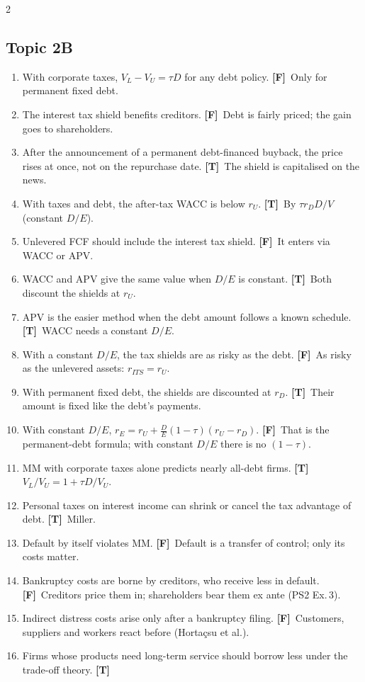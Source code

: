 \documentclass[10pt,a4paper]{article}
\newcommand{\blk}[1]{\subsection*{\color{hd}#1}}
\newcommand{\T}{\textbf{\color{ok}[T]}~}
\newcommand{\F}{\textbf{\color{wr}[F]}~}
\begin{document}
\begin{multicols}{2}
\blk{Topic 2B}
\begin{enumerate}[label=\arabic*.,start=48,leftmargin=1.6em,itemsep=2pt]
  \item With corporate taxes, $V_L-V_U=\tau D$ for any debt policy. \F Only for permanent fixed debt.
  \item The interest tax shield benefits creditors. \F Debt is fairly priced; the gain goes to
        shareholders.
  \item After the announcement of a permanent debt-financed buyback, the price rises at once, not on
        the repurchase date. \T The shield is capitalised on the news.
  \item With taxes and debt, the after-tax WACC is below $r_U$. \T By $\tau r_D D/V$ (constant $D/E$).
  \item Unlevered FCF should include the interest tax shield. \F It enters via WACC or APV.
  \item WACC and APV give the same value when $D/E$ is constant. \T Both discount the shields at $r_U$.
  \item APV is the easier method when the debt amount follows a known schedule. \T WACC needs a
        constant $D/E$.
  \item With a constant $D/E$, the tax shields are as risky as the debt. \F As risky as the
        unlevered assets: $r_{ITS}=r_U$.
  \item With permanent fixed debt, the shields are discounted at $r_D$. \T Their amount is fixed like
        the debt's payments.
  \item With constant $D/E$, $r_E=r_U+\frac DE(1-\tau)(r_U-r_D)$. \F That is the permanent-debt
        formula; with constant $D/E$ there is no $(1-\tau)$.
  \item MM with corporate taxes alone predicts nearly all-debt firms. \T $V_L/V_U=1+\tau D/V_U$.
  \item Personal taxes on interest income can shrink or cancel the tax advantage of debt. \T Miller.
  \item Default by itself violates MM. \F Default is a transfer of control; only its costs matter.
  \item Bankruptcy costs are borne by creditors, who receive less in default. \F Creditors price them
        in; shareholders bear them ex ante (PS2 Ex.\,3).
  \item Indirect distress costs arise only after a bankruptcy filing. \F Customers, suppliers and
        workers react before (Hortaçsu et al.).
  \item Firms whose products need long-term service should borrow less under the trade-off theory. \T

\end{enumerate}
\end{multicols}
\end{document}
